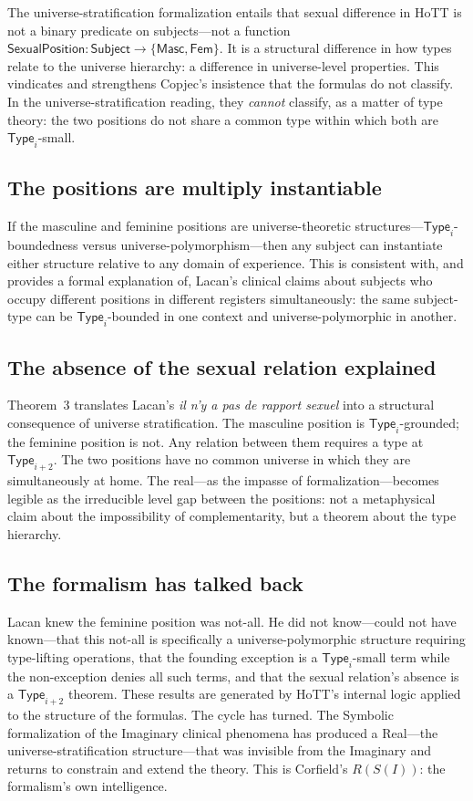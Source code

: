\documentclass[12pt]{article}
\theoremstyle{definition}
\theoremstyle{remark}
\newcommand{\Type}[1]{\mathsf{Type}_{#1}}
\newcommand{\rapport}{\textit{il n'y a pas de rapport sexuel}}
\begin{document}
The universe-stratification formalization entails that sexual difference in HoTT is not a binary predicate on subjects---not a function $\mathsf{SexualPosition} : \mathsf{Subject} \to \{\mathsf{Masc}, \mathsf{Fem}\}$. It is a structural difference in how types relate to the universe hierarchy: a difference in universe-level properties. This vindicates and strengthens Copjec's insistence that the formulas do not classify. In the universe-stratification reading, they \emph{cannot} classify, as a matter of type theory: the two positions do not share a common type within which both are $\Type{i}$-small.

\subsection{The positions are multiply instantiable}

If the masculine and feminine positions are universe-theoretic structures---$\Type{i}$-boundedness versus universe-polymorphism---then any subject can instantiate either structure relative to any domain of experience. This is consistent with, and provides a formal explanation of, Lacan's clinical claims about subjects who occupy different positions in different registers simultaneously: the same subject-type can be $\Type{i}$-bounded in one context and universe-polymorphic in another.

\subsection{The absence of the sexual relation explained}

Theorem~3 translates Lacan's \rapport{} into a structural consequence of universe stratification. The masculine position is $\Type{i}$-grounded; the feminine position is not. Any relation between them requires a type at $\Type{i+2}$. The two positions have no common universe in which they are simultaneously at home. The real---as the impasse of formalization---becomes legible as the irreducible level gap between the positions: not a metaphysical claim about the impossibility of complementarity, but a theorem about the type hierarchy.

\subsection{The formalism has talked back}

Lacan knew the feminine position was not-all. He did not know---could not have known---that this not-all is specifically a universe-polymorphic structure requiring type-lifting operations, that the founding exception is a $\Type{i}$-small term while the non-exception denies all such terms, and that the sexual relation's absence is a $\Type{i+2}$ theorem. These results are generated by HoTT's internal logic applied to the structure of the formulas. The cycle has turned. The Symbolic formalization of the Imaginary clinical phenomena has produced a Real---the universe-stratification structure---that was invisible from the Imaginary and returns to constrain and extend the theory. This is Corfield's $R(S(I))$: the formalism's own intelligence.
\end{document}
